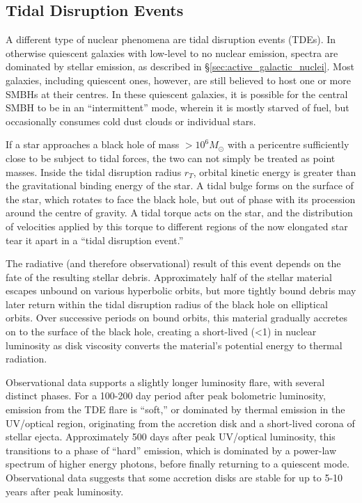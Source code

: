 \documentclass[a4paper,11pt]{article}
\begin{document}
\subsection{Tidal Disruption Events}\label{sec:tidal_disruption_events}

A different type of nuclear phenomena are tidal disruption events (TDEs). In otherwise quiescent galaxies with low-level to no nuclear emission, spectra are dominated by stellar emission, as described in \S \ref{sec:active_galactic_nuclei}. Most galaxies, including quiescent ones, however, are still believed to host one or more SMBHs at their centres.\cite{Rees_1988} In these quiescent galaxies, it is possible for the central SMBH to be in an ``intermittent'' mode, wherein it is mostly starved of fuel, but occasionally consumes cold dust clouds or individual stars.\cite{Holoien_2016a, Rees_1988, Evans_1989}

If a star approaches a black hole of mass $>10^6M_\odot$ with a pericentre sufficiently close to be subject to tidal forces, the two can not simply be treated as point masses. Inside the tidal disruption radius $r_T$, orbital kinetic energy is greater than the gravitational binding energy of the star. A tidal bulge forms on the surface of the star, which rotates to face the black hole, but out of phase with its procession around the centre of gravity. A tidal torque acts on the star, and the distribution of velocities applied by this torque to different regions of the now elongated star tear it apart in a ``tidal disruption event.''\cite{Rees_1988, Evans_1989}

The radiative (and therefore observational) result of this event depends on the fate of the resulting stellar debris. Approximately half of the stellar material escapes unbound on various hyperbolic orbits, but more tightly bound debris may later return within the tidal disruption radius of the black hole on elliptical orbits.\cite{Rees_1988} Over successive periods on bound orbits, this material gradually accretes on to the surface of the black hole, creating a short-lived (\textless\SI{1}{\year}) in nuclear luminosity as disk viscosity converts the material's potential energy to thermal radiation.\cite{Evans_1989}

Observational data supports a slightly longer luminosity flare, with several distinct phases. For a 100-200 day period after peak bolometric luminosity, emission from the TDE flare is ``soft,'' or dominated by thermal emission in the UV/optical region, originating from the accretion disk and a short-lived corona of stellar ejecta. Approximately 500 days after peak UV/optical luminosity, this transitions to a phase of ``hard'' emission, which is dominated by a power-law spectrum of higher energy photons, before finally returning to a quiescent mode.\cite{Wevers_2021} Observational data suggests that some accretion disks are stable for up to 5-10 years after peak luminosity.\cite{van_Velzen_2019}
\end{document}
